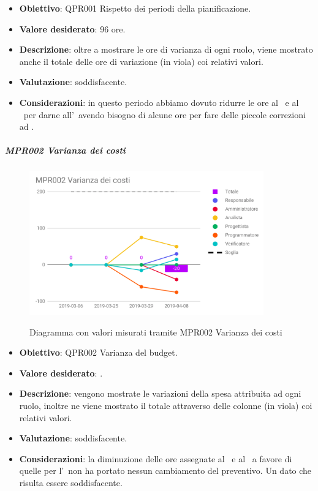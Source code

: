 	\begin{itemize}
		\item \textbf{Obiettivo}: QPR001 Rispetto dei periodi della pianificazione.
		\item \textbf{Valore desiderato}: 96 ore.
		\item \textbf{Descrizione}: oltre a mostrare le ore di varianza di ogni ruolo, viene mostrato anche il totale delle ore di variazione (in viola) coi relativi valori.
		\item \textbf{Valutazione}: soddisfacente.
		\item \textbf{Considerazioni}: in questo periodo abbiamo dovuto ridurre le ore al
		\Progr\ e al \Ver\ per darne all'\Ana\ avendo bisogno di alcune ore per fare delle piccole correzioni
		ad \AdRd.
	\end{itemize}

		\subparagraph{MPR002 Varianza dei costi}
	
	\begin{figure}[H]
		\centering
		\includegraphics[width=0.9\textwidth]{img/cruscotti/RQ/MPR002.png}
		\label{immagineVarianzaCostiRQ}
		\caption{Diagramma con valori misurati tramite MPR002 Varianza dei costi}
	\end{figure}
	
	\begin{itemize}
		\item \textbf{Obiettivo}: QPR002 Varianza del budget.
		\item \textbf{Valore desiderato}: .
		\item \textbf{Descrizione}: vengono mostrate le variazioni della spesa attribuita ad ogni ruolo, inoltre ne viene mostrato il totale attraverso delle colonne (in viola) coi relativi valori.
		\item \textbf{Valutazione}: soddisfacente.
		\item \textbf{Considerazioni}: la diminuzione delle ore assegnate al \Progr\ e al \Ver\ a favore di quelle per l'\Ana\, non ha portato nessun cambiamento del preventivo. Un dato che
		risulta essere soddisfacente.
	\end{itemize}

